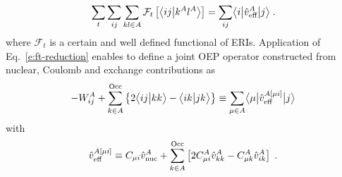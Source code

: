 %
\begin{equation} \label{e:ft-reduction}
	\sum_t \sum_{ij}\sum_{kl\in A} {\mathcal{F}}_t\left[ 
   \bigl\langle {ij} \bigl\lvert {k^Al^A} \bigr\rangle
 \right] = \sum_{ij} \bigl\langle {i} \bigl\lvert {\hat{v}_{\text{eff}}^A} \bigl\lvert {j} \bigr\rangle \;.
\end{equation}
%
where ${\mathcal{F}}_t$ is a certain and well defined functional of ERIs.
Application of Eq.~\eqref{e:ft-reduction} enables to define
a joint OEP
operator constructed from nuclear, Coulomb and exchange
contributions as
%
\begin{equation}
 -W^A_{ij} + 
 \sum_{k\in A}^{\rm Occ} 
  \left\{ 2\bigl\langle {ij} \bigl\lvert {kk} \bigr\rangle - \bigl\langle {ik} \bigl\lvert {jk} \bigr\rangle \right\}
\equiv \sum_{\mu\in A} \bigl\langle {\mu} \bigl\lvert { 
\hat{v}^{A[\mu i]}_{\rm eff}
 } \bigl\lvert {j} \bigr\rangle
\end{equation}
%
with
%
\begin{equation}
 \hat{v}^{A[\mu i]}_{\rm eff} \equiv C_{\mu i} \hat{v}^A_{\rm nuc} + 
 \sum_{k\in A}^{\rm Occ} \left[
 2C_{\mu i}^A \hat{v}^A_{kk} - C_{\mu k}^A \hat{v}^A_{ik}
 \right] \;.
\end{equation}
%
%
%
